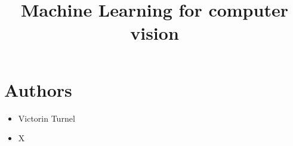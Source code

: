 \documentclass[10pt]{article}
\date{}
\title{\vspace{-1cm}Machine Learning for computer vision}
\begin{document}
	\maketitle
	\vspace{-2cm}
	\thispagestyle{fancy}
	
	\section*{Authors}
	\begin{itemize}
		\item Victorin Turnel
		\item X
	\end{itemize}
	
	
	\clearpage
	
	\clearpage
	
	\clearpage
	
	\clearpage
	
	\clearpage
	
	
\end{document}
